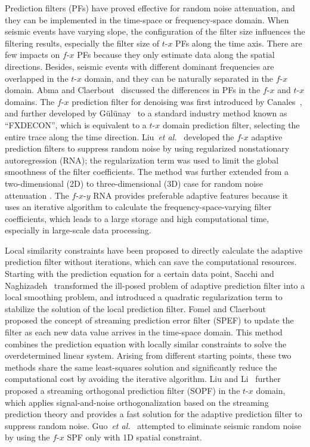 Prediction filters (PFs) have proved effective for random noise
attenuation, and they can be implemented in the time-space or
frequency-space domain. When seismic events have varying slope, the
configuration of the filter size influences the filtering results,
especially the filter size of $t$-$x$ PFs along the time axis. There
are few impacts on $f$-$x$ PFs because they only estimate data along
the spatial directions. Besides, seismic events with different
dominant frequencies are overlapped in the $t$-$x$ domain, and they
can be naturally separated in the $f$-$x$ domain. Abma and
Claerbout~\cite{Abma95} discussed the differences in PFs in the
$f$-$x$ and $t$-$x$ domains.  The $f$-$x$ prediction filter for
denoising was first introduced by Canales~\cite{Canales84}, and
further developed by G{\"u}l{\"u}nay~\cite{Gulunay86} to a standard
industry method known as “FXDECON”, which is equivalent to a $t$-$x$
domain prediction filter, selecting the entire trace along the time
direction.  Liu~\textit{et al.}~\cite{Liu12} developed the $f$-$x$
adaptive prediction filters to suppress random noise by using
regularized nonstationary autoregression (RNA); the regularization
term was used to limit the global smoothness of the filter
coefficients. The method was further extended from a two-dimensional
(2D) to three-dimensional (3D) case for random noise attenuation
\cite{Liug13}. The $f$-$x$-$y$ RNA provides preferable adaptive
features because it uses an iterative algorithm to calculate the
frequency-space-varying filter coefficients, which leads to a large
storage and high computational time, especially in large-scale data
processing.

Local similarity constraints have been proposed to directly calculate
the adaptive prediction filter without iterations, which can save the
computational resources. Starting with the prediction equation for a
certain data point, Sacchi and Naghizadeh~\cite{Sacchi09} transformed
the ill-posed problem of adaptive prediction filter into a local
smoothing problem, and introduced a quadratic regularization term to
stabilize the solution of the local prediction filter.  Fomel and
Claerbout~\cite{Fomel16} proposed the concept of streaming prediction
error filter (SPEF) to update the filter as each new data value
arrives in the time-space domain. This method combines the prediction
equation with locally similar constraints to solve the overdetermined
linear system. Arising from different starting points, these two
methods share the same least-squares solution and significantly reduce
the computational cost by avoiding the iterative algorithm.  Liu and
Li~\cite{Liuy18} further proposed a streaming orthogonal prediction
filter (SOPF) in the $t$-$x$ domain, which applies signal-and-noise
orthogonalization based on the streaming prediction theory and
provides a fast solution for the adaptive prediction filter to
suppress random noise. Guo~\textit{et al.}~\cite{Guo20} attempted to
eliminate seismic random noise by using the $f$-$x$ SPF only with 1D
spatial constraint.

